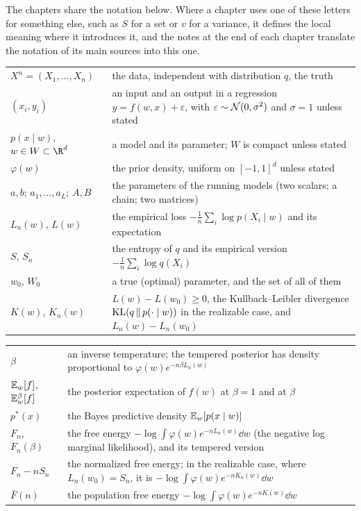 
The chapters share the notation below. Where a chapter uses one of these letters for something else, such as $S$ for a set or $v$ for a variance, it defines the local meaning where it introduces it, and the notes at the end of each chapter translate the notation of its main sources into this one.


\begin{tabular}{@{}p{}p{}@{}}
$X^n=(X_1,\dots,X_n)$ & the data, independent with distribution $q$, the truth \\
$(x_i,y_i)$ & an input and an output in a regression $y=f(w,x)+\varepsilon$, with $\varepsilon\sim\mathcal{N}(0,\sigma^2)$ and $\sigma=1$ unless stated \\
$p(x\mid w)$, $w\in W\subset\R^d$ & a model and its parameter; $W$ is compact unless stated \\
$\varphi(w)$ & the prior density, uniform on $[-1,1]^d$ unless stated \\
$a,b$; $a_1,\dots,a_L$; $A,B$ & the parameters of the running models (two scalars; a chain; two matrices) \\
$L_n(w)$, $L(w)$ & the empirical loss $-\frac1n\sum_i\log p(X_i\mid w)$ and its expectation \\
$S$, $S_n$ & the entropy of $q$ and its empirical version $-\frac1n\sum_i\log q(X_i)$ \\
$w_0$, $W_0$ & a true (optimal) parameter, and the set of all of them \\
$K(w)$, $K_n(w)$ & $L(w)-L(w_0)\ge0$, the Kullback--Leibler divergence $\operatorname{KL}(q\,\|\,p(\cdot\mid w))$ in the realizable case, and $L_n(w)-L_n(w_0)$
\end{tabular}


\begin{tabular}{@{}p{}p{}@{}}
$\beta$ & an inverse temperature; the tempered posterior has density proportional to $\varphi(w)e^{-n\beta L_n(w)}$ \\
$\mathbb{E}_{w}\!\left[f\right]$, $\mathbb{E}^{\beta}_{w}\!\left[f\right]$ & the posterior expectation of $f(w)$ at $\beta=1$ and at $\beta$ \\
$p^*(x)$ & the Bayes predictive density $\mathbb{E}_{w}\!\left[p(x\mid w)\right]$ \\
$F_n$, $F_n(\beta)$ & the free energy $-\log\int\varphi(w)e^{-nL_n(w)}\dd w$ (the negative log marginal likelihood), and its tempered version \\
$F_n-nS_n$ & the normalized free energy; in the realizable case, where $L_n(w_0)=S_n$, it is $-\log\int\varphi(w)e^{-nK_n(w)}\dd w$ \\
$\bar F(n)$ & the population free energy $-\log\int\varphi(w)e^{-nK(w)}\dd w$
\end{tabular}

